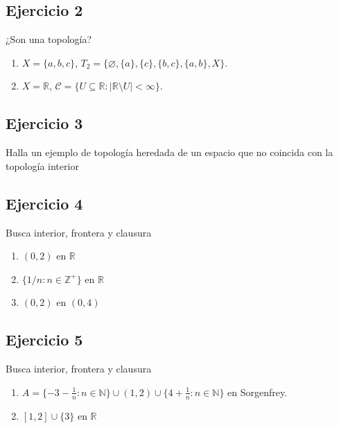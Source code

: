 \documentclass[12pt,a4paper]{article}
\begin{document}
\vspace{10cm}

\subsection*{Ejercicio 2}
¿Son una topología?
\begin{enumerate}
    \item $X=\{a,b,c\}$, $T_2=\{\varnothing,\{a\},\{c\},\{b,c\},\{a,b\},X\}$.
    \item $X=\mathbb{R}$, $\mathcal{C}=\{U\subseteq\mathbb{R}:|\mathbb{R}\setminus U|<\infty\}$.
\end{enumerate}

\vspace{10cm}

\subsection*{Ejercicio 3}
Halla un ejemplo de topología heredada de un espacio que no coincida con la topología interior

\vspace{10cm}

\subsection*{Ejercicio 4}
Busca interior, frontera y clausura
\begin{enumerate}
    \item $(0,2)$ en $\mathbb{R}$
    \item $\{1/n : n\in\mathbb{Z}^+\}$ en $\mathbb{R}$
    \item $(0,2)$ en $(0,4)$
\end{enumerate}

\vspace{10cm}

\subsection*{Ejercicio 5}
Busca interior, frontera y clausura
\begin{enumerate}
    \item $A = \{-3-\tfrac{1}{n}:n\in\mathbb{N}\}\cup(1,2)\cup\{4+\tfrac{1}{n}:n\in\mathbb{N}\}$ en Sorgenfrey.
    \item $[1,2]\cup\{3\}$ en $\mathbb{R}$
\end{enumerate}

\vspace{10cm}
\end{document}
